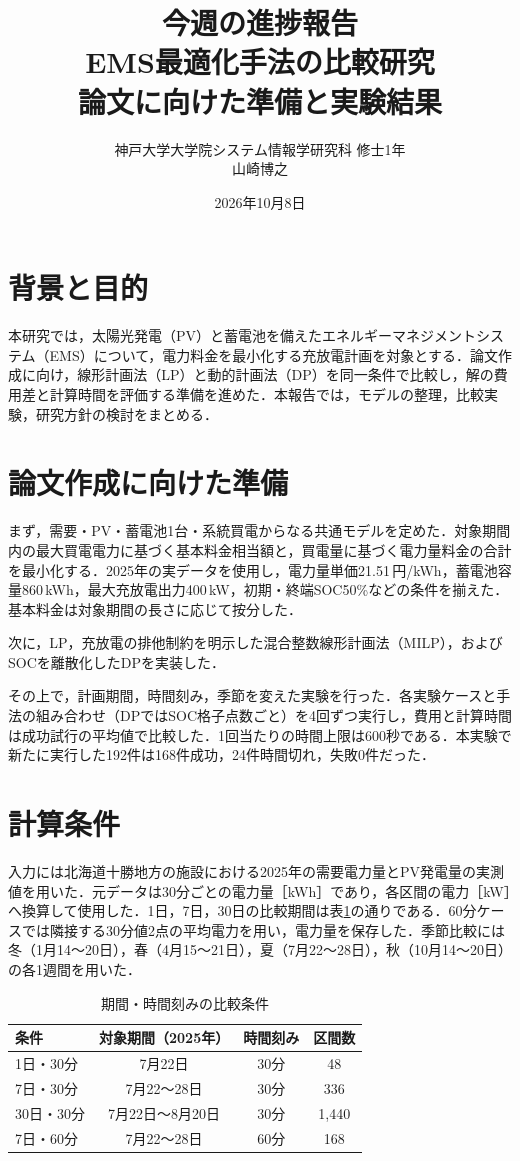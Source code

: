 \documentclass[a4paper,11pt,xelatex,ja=standard]{bxjsarticle}
\title{今週の進捗報告\\[0.5em]\large EMS最適化手法の比較研究\\論文に向けた準備と実験結果}
\author{神戸大学大学院システム情報学研究科 修士1年\\山崎博之}
\date{2026年10月8日}
\begin{document}
\maketitle

\section{背景と目的}
本研究では，太陽光発電（PV）と蓄電池を備えたエネルギーマネジメントシステム（EMS）について，電力料金を最小化する充放電計画を対象とする．論文作成に向け，線形計画法（LP）と動的計画法（DP）を同一条件で比較し，解の費用差と計算時間を評価する準備を進めた．本報告では，モデルの整理，比較実験，研究方針の検討をまとめる．

\section{論文作成に向けた準備}
まず，需要・PV・蓄電池1台・系統買電からなる共通モデルを定めた．対象期間内の最大買電電力に基づく基本料金相当額と，買電量に基づく電力量料金の合計を最小化する．2025年の実データを使用し，電力量単価21.51\,円/kWh，蓄電池容量860\,kWh，最大充放電出力400\,kW，初期・終端SOC50\%などの条件を揃えた．基本料金は対象期間の長さに応じて按分した．

次に，LP，充放電の排他制約を明示した混合整数線形計画法（MILP），およびSOCを離散化したDPを実装した．

その上で，計画期間，時間刻み，季節を変えた実験を行った．各実験ケースと手法の組み合わせ（DPではSOC格子点数ごと）を4回ずつ実行し，費用と計算時間は成功試行の平均値で比較した．1回当たりの時間上限は600秒である．本実験で新たに実行した192件は168件成功，24件時間切れ，失敗0件だった．

\section{計算条件}
入力には北海道十勝地方の施設における2025年の需要電力量とPV発電量の実測値を用いた．元データは30分ごとの電力量［kWh］であり，各区間の電力［kW］へ換算して使用した．1日，7日，30日の比較期間は表\ref{tab:conditions}の通りである．60分ケースでは隣接する30分値2点の平均電力を用い，電力量を保存した．季節比較には冬（1月14～20日），春（4月15～21日），夏（7月22～28日），秋（10月14～20日）の各1週間を用いた．

\begin{table}[htbp]
    \centering
    \caption{期間・時間刻みの比較条件}
    \label{tab:conditions}
    \begin{tabular}{lccc}
        \toprule
        条件      & 対象期間（2025年） & 時間刻み & 区間数   \\
        \midrule
        1日・30分  & 7月22日       & 30分  & 48    \\
        7日・30分  & 7月22～28日    & 30分  & 336   \\
        30日・30分 & 7月22日～8月20日 & 30分  & 1,440 \\
        7日・60分  & 7月22～28日    & 60分  & 168   \\
        \bottomrule
    \end{tabular}
\end{table}
\end{document}

